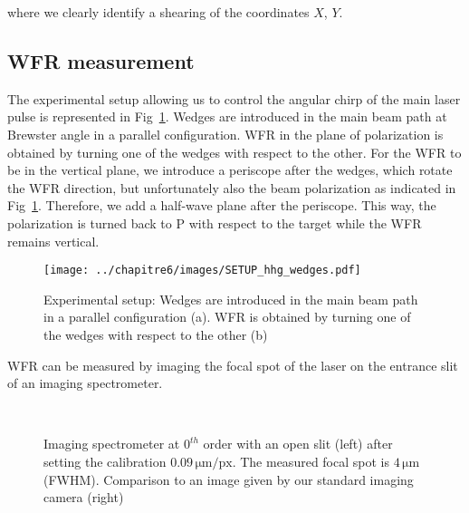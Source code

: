 \noindent where we clearly identify a shearing of the coordinates $X$, $Y$.

\subsection{WFR measurement}\label{subsub:Wavefront rotation measurement}

The experimental setup allowing us to control the angular chirp  of the main laser pulse is represented in Fig~\ref{fig:SETUP_hhg_wedges}. Wedges are introduced in the main beam path at Brewster angle in a parallel configuration. WFR in the plane of polarization is obtained by turning one of the wedges with respect to the other. For the WFR to be in the vertical plane, we introduce a periscope after the wedges, which rotate the WFR direction, but unfortunately also the beam polarization as indicated in Fig~\ref{fig:SETUP_hhg_wedges}. Therefore, we add a half-wave plane after the periscope. This way, the polarization is turned back to P with respect to the target while the WFR remains vertical.

\begin{figure}[H]
\centering
\texttt{[image: ../chapitre6/images/SETUP\_hhg\_wedges.pdf]}\\
\caption{\label{fig:SETUP_hhg_wedges} Experimental setup: Wedges are introduced in the main beam path in a parallel configuration (a). WFR is obtained by turning one of the wedges with respect to the other (b)}
\end{figure}

\noindent WFR can be measured by imaging the focal spot of the laser on the entrance slit of an imaging spectrometer.



\begin{figure}[H]
\begin{center}
\\
\caption{\label{Focal_20140806_calibration} Imaging spectrometer at $0^{th}$ order with an open slit (left) after setting the calibration $0.09\,\mathrm{\mu m / px}$. The measured focal spot is $4\,\mathrm{\mu m}$ (FWHM). Comparison to an image given by our standard imaging camera (right)}
\end{center}
\end{figure}



